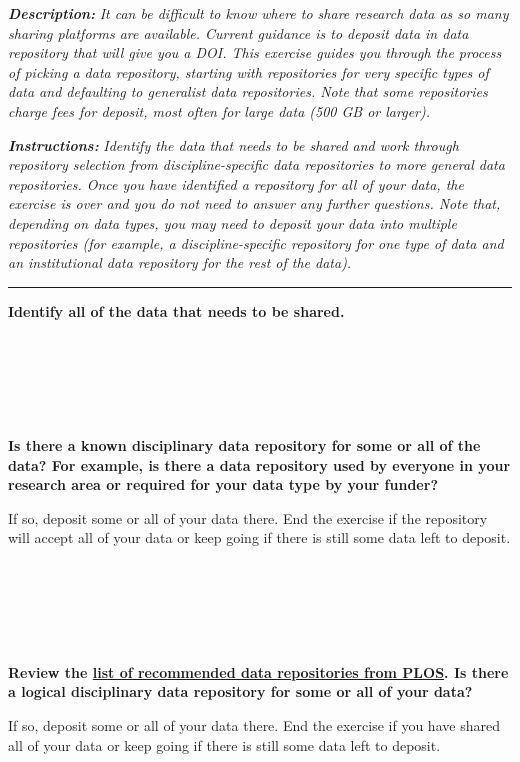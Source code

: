 \documentclass[
]{book}
\begin{document}
\textbf{\emph{Description:}} \emph{It can be difficult to know where to share research data as so many sharing platforms are available. Current guidance is to deposit data in data repository that will give you a DOI. This exercise guides you through the process of picking a data repository, starting with repositories for very specific types of data and defaulting to generalist data repositories. Note that some repositories charge fees for deposit, most often for large data (500 GB or larger).}

\textbf{\emph{Instructions:}} \emph{Identify the data that needs to be shared and work through repository selection from discipline-specific data repositories to more general data repositories. Once you have identified a repository for all of your data, the exercise is over and you do not need to answer any further questions. Note that, depending on data types, you may need to deposit your data into multiple repositories (for example, a discipline-specific repository for one type of data and an institutional data repository for the rest of the data).}

\begin{center}\rule{0.5\linewidth}{0.5pt}\end{center}

\textbf{Identify all of the data that needs to be shared.}

~

~

~

\textbf{Is there a known disciplinary data repository for some or all of the data? For example, is there a data repository used by everyone in your research area or required for your data type by your funder?}

If so, deposit some or all of your data there. End the exercise if the repository will accept all of your data or keep going if there is still some data left to deposit.

~

~

~

\textbf{Review the \href{https://journals.plos.org/plosone/s/recommended-repositories}{list of recommended data repositories from PLOS}. Is there a logical disciplinary data repository for some or all of your data?}

If so, deposit some or all of your data there. End the exercise if you have shared all of your data or keep going if there is still some data left to deposit.

~
\end{document}
